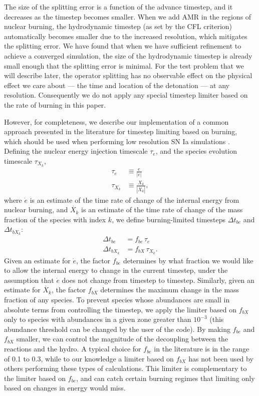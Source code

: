 \documentclass[twocolumn,numberedappendix]{../aastex62}
\begin{document}

The size of the splitting error is a function of the advance timestep, and it
decreases as the timestep becomes smaller. When we add AMR in the regions of
nuclear burning, the hydrodynamic timestep (as set by the CFL criterion)
automatically becomes smaller due to the increased resolution, which mitigates
the splitting error. We have found that when we have sufficient refinement to
achieve a converged simulation, the size of the hydrodynamic timestep is already
small enough that the splitting error is minimal. For the test problem that we
will describe later, the operator splitting has no observable effect on the
physical effect we care about --- the time and location of the detonation --- at
any resolution. Consequently we do not apply any special timestep limiter based
on the rate of burning in this paper.

However, for completeness, we describe our implementation of a common approach
presented in the literature for timestep limiting based on burning, which should
be used when performing low resolution SN Ia simulations \citep{raskin:2010,hawley:2012}.
Defining the nuclear energy injection timescale $\tau_e$, and the species evolution
timescale $\tau_{X_k}$,
\begin{align}
  \tau_e &\equiv \frac{e}{|\dot{e}|} \\
  \tau_{X_k} &\equiv \frac{X_k}{|\dot{X_k}|},
\end{align}
where $\dot{e}$ is an estimate of the time rate of change of the internal energy
from nuclear burning, and $\dot{X_k}$ is an estimate of the time rate of change 
of the mass fraction of the species with index $k$, we define burning-limited 
timesteps $\Delta t_{be}$ and $\Delta t_{bX_k}$:
\begin{align}
  \Delta t_{be} &= f_{be}\, \tau_e \label{eq:timestep_e}\\
  \Delta t_{bX_k} &= f_{bX}\, \tau_{X_k}. \label{eq:timestep_X}
\end{align}
Given an estimate for $\dot{e}$, the factor $f_{be}$ determines by what 
fraction we would like to allow the internal energy to change
in the current timestep, under the assumption that $\dot{e}$ does not change from
timestep to timestep. Similarly, given an estimate for $\dot{X_k}$, the factor $f_{bX}$ 
determines the maximum change in the mass fraction of any species. To prevent species
whose abundances are small in absolute terms from controlling the timestep, we apply
the limiter based on $f_{bX}$ only to species with abundances in a given zone greater
than $10^{-3}$ (this abundance threshold can be changed by the user of the code). By making 
$f_{be}$ and $f_{bX}$ smaller, we can control the magnitude of the decoupling 
between the reactions and the hydro. A typical choice for $f_{be}$ in the
literature is in the range of 0.1 to 0.3, while to our knowledge a limiter based on
$f_{bX}$ has not been used by others performing these types of calculations.
This limiter is complementary to the limiter based on $f_{be}$, and can catch
certain burning regimes that limiting only based on changes in energy would miss.
\end{document}
